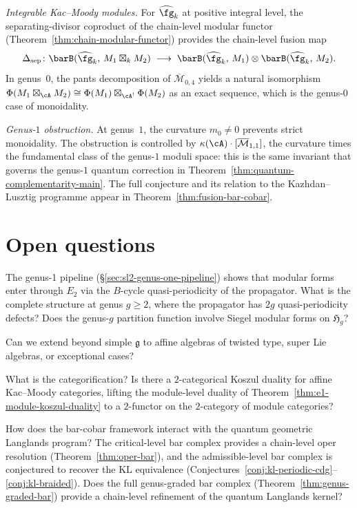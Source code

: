 \emph{Integrable Kac--Moody modules.}
For $\widehat{\fg}_k$ at positive integral level, the
separating-divisor coproduct of the chain-level modular functor
(Theorem~\ref{thm:chain-modular-functor}) provides the
chain-level fusion map
\[
\Delta_{\mathrm{sep}}\colon
\barB(\widehat{\fg}_k,\, M_1 \boxtimes_k M_2)
\;\longrightarrow\;
\barB(\widehat{\fg}_k,\, M_1)
\otimes \barB(\widehat{\fg}_k,\, M_2).
\]
In genus~$0$, the pants decomposition of
$\overline{\mathcal{M}}_{0,4}$ yields a natural isomorphism
$\Phi(M_1 \boxtimes_\cA M_2)
\cong \Phi(M_1) \boxtimes_{\cA^!} \Phi(M_2)$
as an exact sequence, which is the genus-$0$ case of
monoidality.

\emph{Genus-$1$ obstruction.}
At genus~$1$, the curvature $m_0 \neq 0$ prevents strict
monoidality.  The obstruction is controlled by
$\kappa(\cA) \cdot [\overline{\mathcal{M}}_{1,1}]$, the
curvature times the fundamental class of the genus-$1$ moduli
space: this is the same invariant that governs the
genus-$1$ quantum correction in
Theorem~\ref{thm:quantum-complementarity-main}.  The full
conjecture and its relation to the Kazhdan--Lusztig programme
appear in Theorem~\ref{thm:fusion-bar-cobar}.

\section{Open questions}

\begin{question}
The genus-1 pipeline (\S\ref{sec:sl2-genus-one-pipeline}) shows that modular forms enter through $E_2$ via the $B$-cycle quasi-periodicity of the propagator.  What is the complete structure at genus $g \geq 2$, where the propagator has $2g$ quasi-periodicity defects?  Does the genus-$g$ partition function involve Siegel modular forms on $\mathfrak{H}_g$?
\end{question}

\begin{question}
Can we extend beyond simple $\mathfrak{g}$ to affine algebras of twisted type, super Lie algebras, or exceptional cases?
\end{question}

\begin{question}
What is the categorification?  Is there a $2$-categorical Koszul
duality for affine Kac--Moody categories, lifting the module-level
duality of Theorem~\ref{thm:e1-module-koszul-duality} to a
$2$-functor on the $2$-category of module categories?
\end{question}

\begin{question}
How does the bar-cobar framework interact with the quantum geometric
Langlands program?  The critical-level bar complex provides a
chain-level oper resolution
(Theorem~\ref{thm:oper-bar}), and the admissible-level bar
complex is conjectured to recover the KL equivalence
(Conjectures~\ref{conj:kl-periodic-cdg}--\ref{conj:kl-braided}).  Does the full genus-graded
bar complex (Theorem~\ref{thm:genus-graded-bar}) provide a
chain-level refinement of the quantum Langlands kernel?
\end{question}
